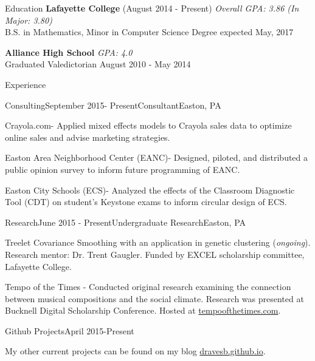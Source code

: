 \documentclass{resume} %
\begin{document}
\begin{rSection}{Education}
{\bf Lafayette College} (August 2014 - Present) \hfill {\em Overall GPA: 3.86 (In Major: 3.80)} \\ 
B.S. in Mathematics, Minor in Computer Science \hfill Degree expected May, 2017

{\bf Alliance High School} \hfill {\em GPA: 4.0} \\ 
Graduated Valedictorian \hfill August 2010 - May 2014
\end{rSection}

\begin{rSection}{Experience}

\begin{rSubsection}{Consulting}{September 2015- Present}{Consultant}{Easton, PA} 
\item Crayola.com- Applied mixed effects models to Crayola sales data to optimize online sales and advise marketing strategies.
\item Easton Area Neighborhood Center (EANC)- Designed, piloted, and distributed a public opinion survey to inform future programming of EANC. 
\item Easton City Schools (ECS)- Analyzed the effects of the Classroom Diagnostic Tool (CDT) on student's Keystone exams to inform circular design of ECS. 
\end{rSubsection}

\begin{rSubsection}{Research}{June 2015 - Present}{Undergraduate Research}{Easton, PA}
\item Treelet Covariance Smoothing with an application in genetic clustering (\textit{ongoing}). Research mentor: Dr. Trent Gaugler. Funded by EXCEL scholarship committee, Lafayette College. 
\item Tempo of the Times - Conducted original research examining the connection between musical compositions and the social climate. Research was presented at Bucknell Digital Scholarship Conference. Hosted at \href{http://tempoofthetimes.com}{tempoofthetimes.com}.  

\end{rSubsection}

\begin{rSubsection}{Github Projects}{April 2015-Present}{}{}
\item My other current projects can be found on my blog \href{http://dravesb.github.io}{dravesb.github.io}.
\end{rSubsection}

\end{rSection}
\end{document}
